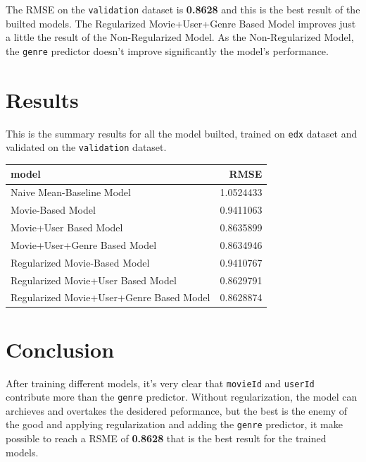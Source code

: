 \documentclass[]{article}
\begin{document}
The RMSE on the \texttt{validation} dataset is \textbf{0.8628} and this
is the best result of the builted models. The Regularized
Movie+User+Genre Based Model improves just a little the result of the
Non-Regularized Model. As the Non-Regularized Model, the \texttt{genre}
predictor doesn't improve significantly the model's performance.

\hypertarget{results}{%
\section{Results}\label{results}}

This is the summary results for all the model builted, trained on
\texttt{edx} dataset and validated on the \texttt{validation} dataset.

\begin{table}[H]
\centering\begingroup\fontsize{10}{12}\selectfont

\begin{tabular}{l|r}
\hline
model & RMSE\\
\hline
Naive Mean-Baseline Model & 1.0524433\\
\hline
Movie-Based Model & 0.9411063\\
\hline
Movie+User Based Model & 0.8635899\\
\hline
Movie+User+Genre Based Model & 0.8634946\\
\hline
Regularized Movie-Based Model & 0.9410767\\
\hline
Regularized Movie+User Based Model & 0.8629791\\
\hline
Regularized Movie+User+Genre Based Model & 0.8628874\\
\hline
\end{tabular}
\endgroup{}
\end{table}

\hypertarget{conclusion}{%
\section{Conclusion}\label{conclusion}}

After training different models, it's very clear that \texttt{movieId}
and \texttt{userId} contribute more than the \texttt{genre} predictor.
Without regularization, the model can archieves and overtakes the
desidered peformance, but the best is the enemy of the good and applying
regularization and adding the \texttt{genre} predictor, it make possible
to reach a RSME of \textbf{0.8628} that is the best result for the
trained models.
\end{document}

